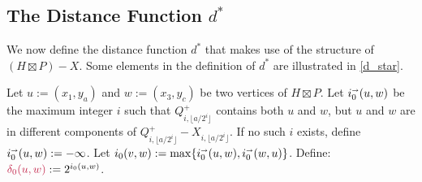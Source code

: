 \documentclass{patmorin}
\makeatletter
\def\mathcolor#1#{\@mathcolor{#1}}
\def\@mathcolor#1#2#3{%
  \protect\leavevmode
  \begingroup
    \color#1{#2}#3%
  \endgroup
}
\newcommand{\mathdefin}[1]{\mathcolor{brightmaroon}{#1}}
\makeatother
\begin{document}
\subsection{\boldmath The Distance Function $d^*$}



We now define the distance function $d^*$ that makes use of the structure of $(H\boxtimes P)-X$.  Some elements in the definition of $d^*$ are illustrated in \cref{d_star}.

Let $u:=(x_1,y_a)$ and $w:=(x_3,y_c)$ be two vertices of $H\boxtimes P$.  Let $i_0^{\shortrightarrow}(u,w)$ be the maximum integer $i$ such that $Q^+_{i,\lfloor a/2^i\rfloor}$ contains both $u$ and $w$, but $u$ and $w$ are in different components of $Q^+_{i,\lfloor a/2^i\rfloor}-X_{i,\lfloor a/2^i\rfloor}$.  If no such $i$ exists, define $i_0^{\shortrightarrow}(u,w):=-\infty$.  Let $i_0(v,w):=\max\{i_0^{\shortrightarrow}(u,w),i_0^{\shortrightarrow}(w,u)\}$. Define: $\mathdefin{\delta_0(u,w)}:=2^{i_0(u,w)}$.
\end{document}
